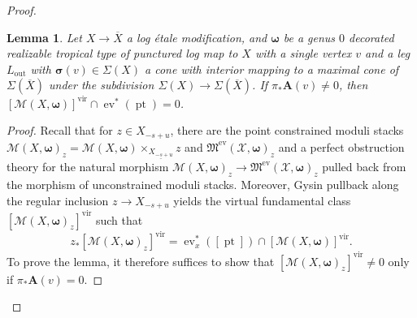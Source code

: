 \documentclass[12pt, oneside]{amsart}   	%
\newcounter{thm}
\newtheorem{lemma}[thm]{Lemma}
\newcommand{\vir}{\operatorname{vir}}
\newcommand{\pt}{\operatorname{pt}}
\newcommand{\ev}{\operatorname{ev}}
\newcommand{\out}{\operatorname{out}}
\numberwithin{equation}{section}
\numberwithin{thm}{section}
\numberwithin{figure}{section}
\begin{document}
\begin{proof}

\begin{lemma}\label{contract}
Let $X \rightarrow \overline{X}$ a log \'etale modification, and $\pmb\omega$ be a genus $0$ decorated realizable tropical type of punctured log map to $X$ with a single vertex $v$ and a leg $L_{\out}$ with $\pmb\sigma(v) \in \Sigma(X)$ a cone with interior mapping to a maximal cone of $\Sigma(\overline{X})$ under the subdivision $\Sigma(X) \rightarrow \Sigma(\overline{X})$. If $\pi_*\textbf{A}(v) \not= 0$, then $[\mathscr{M}(X,\pmb\omega)]^{\vir}\cap \ev^*(\pt) = 0$. 
\end{lemma}

\begin{proof}
Recall that for $z \in X_{-s+u}$, there are the point constrained moduli stacks $\mathscr{M}(X,\pmb\omega)_z = \mathscr{M}(X,\pmb\omega)\times_{\underline{X_{-s+u}}} z$ and $\mathfrak{M}^{\ev}(\mathcal{X},\pmb\omega)_z$ and a perfect obstruction theory for the natural morphism $\mathscr{M}(X,\pmb\omega)_z \rightarrow \mathfrak{M}^{\ev}(\mathcal{X},\pmb\omega)_z$ pulled back from the morphism of unconstrained moduli stacks. Moreover, Gysin pullback along the regular inclusion $z \rightarrow X_{-s+u}$ yields the virtual fundamental class $[\mathscr{M}(X,\pmb\omega)_z]^{\vir}$ such that $$z_*[\mathscr{M}(X,\pmb\omega)_z]^{\vir} = \ev^*_x([\pt])\cap[\mathscr{M}(X,\pmb\omega)]^{\vir}.$$ To prove the lemma, it therefore suffices to show that $[\mathscr{M}(X,\pmb\omega)_z]^{\vir} \not= 0$ only if $\pi_*\textbf{A}(v) = 0$. 


\end{proof}
\end{proof}
\end{document}
